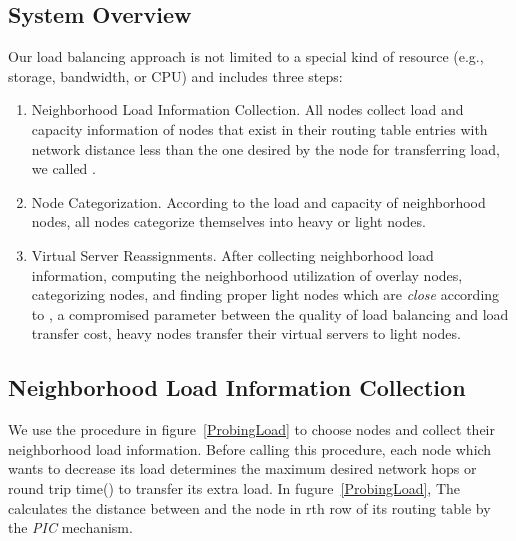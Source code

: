 \documentclass {article}
\begin{document}
\subsection {System Overview}
Our load balancing approach  is not limited to a special kind of resource (e.g., storage, bandwidth, or CPU) and  includes three steps:
\begin{enumerate}
    \item Neighborhood Load Information Collection. All nodes collect load and capacity information of
nodes that exist in their routing table entries with network distance  less than the one desired by
the node for transferring load, we called .
	\item Node Categorization. According to  the load and capacity of neighborhood nodes,
all nodes categorize themselves into heavy or light nodes.
	\item  Virtual Server Reassignments. After collecting  neighborhood  load information, computing the neighborhood utilization of overlay nodes, categorizing nodes, and finding proper  light nodes which
are \emph{close} according to , a compromised parameter between the
quality of load balancing and load transfer cost, heavy nodes transfer their  virtual servers to light nodes.
\end{enumerate}
\subsection{Neighborhood Load Information Collection} \label{Neighborhood}
We use the procedure in figure~\ref{ProbingLoad} to choose nodes and collect their neighborhood load information.
Before calling this procedure, each node which wants to decrease its load determines the maximum desired network hops  or round trip time() to transfer its extra load.
In fugure~\ref{ProbingLoad}, The  calculates the distance between  and the node in rth row of its routing table
 by the \emph{PIC} mechanism.
\end{document}
